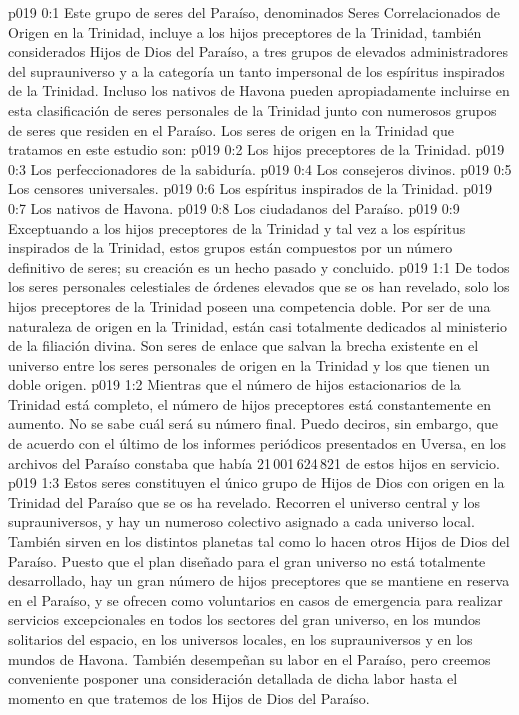 \author{Consejero divino}
\vs p019 0:1 Este grupo de seres del Paraíso, denominados Seres Correlacionados de Origen en la Trinidad, incluye a los hijos preceptores de la Trinidad, también considerados Hijos de Dios del Paraíso, a tres grupos de elevados administradores del suprauniverso y a la categoría un tanto impersonal de los espíritus inspirados de la Trinidad. Incluso los nativos de Havona pueden apropiadamente incluirse en esta clasificación de seres personales de la Trinidad junto con numerosos grupos de seres que residen en el Paraíso. Los seres de origen en la Trinidad que tratamos en este estudio son:
\vs p019 0:2 Los hijos preceptores de la Trinidad.
\vs p019 0:3 Los perfeccionadores de la sabiduría.
\vs p019 0:4 Los consejeros divinos.
\vs p019 0:5 Los censores universales.
\vs p019 0:6 Los espíritus inspirados de la Trinidad.
\vs p019 0:7 Los nativos de Havona.
\vs p019 0:8 Los ciudadanos del Paraíso.
\vs p019 0:9 \pc Exceptuando a los hijos preceptores de la Trinidad y tal vez a los espíritus inspirados de la Trinidad, estos grupos están compuestos por un número definitivo de seres; su creación es un hecho pasado y concluido.
\vs p019 1:1 De todos los seres personales celestiales de órdenes elevados que se os han revelado, solo los hijos preceptores de la Trinidad poseen una competencia doble. Por ser de una naturaleza de origen en la Trinidad, están casi totalmente dedicados al ministerio de la filiación divina. Son seres de enlace que salvan la brecha existente en el universo entre los seres personales de origen en la Trinidad y los que tienen un doble origen.
\vs p019 1:2 Mientras que el número de hijos estacionarios de la Trinidad está completo, el número de hijos preceptores está constantemente en aumento. No se sabe cuál será su número final. Puedo deciros, sin embargo, que de acuerdo con el último de los informes periódicos presentados en Uversa, en los archivos del Paraíso constaba que había 21\,001\,624\,821 de estos hijos en servicio.
\vs p019 1:3 Estos seres constituyen el único grupo de Hijos de Dios con origen en la Trinidad del Paraíso que se os ha revelado. Recorren el universo central y los suprauniversos, y hay un numeroso colectivo asignado a cada universo local. También sirven en los distintos planetas tal como lo hacen otros Hijos de Dios del Paraíso. Puesto que el plan diseñado para el gran universo no está totalmente desarrollado, hay un gran número de hijos preceptores que se mantiene en reserva en el Paraíso, y se ofrecen como voluntarios en casos de emergencia para realizar servicios excepcionales en todos los sectores del gran universo, en los mundos solitarios del espacio, en los universos locales, en los suprauniversos y en los mundos de Havona. También desempeñan su labor en el Paraíso, pero creemos conveniente posponer una consideración detallada de dicha labor hasta el momento en que tratemos de los Hijos de Dios del Paraíso.
